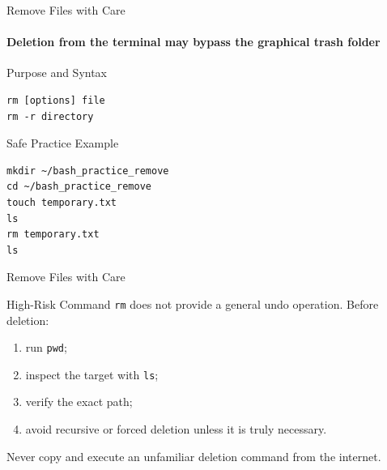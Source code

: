 \begin{frame}[fragile]{Remove Files with Care}
\framesubtitle{Deletion from the terminal may bypass the graphical trash folder}

\footnotesize

\begin{block}{Purpose and Syntax}
\begin{verbatim}
rm [options] file
rm -r directory
\end{verbatim}
\end{block}

\begin{exampleblock}{Safe Practice Example}
\begin{verbatim}
mkdir ~/bash_practice_remove
cd ~/bash_practice_remove
touch temporary.txt
ls
rm temporary.txt
ls
\end{verbatim}
\end{exampleblock}
\end{frame}


\begin {frame}[fragile]{Remove Files with Care}

\begin{alertblock}{High-Risk Command}
\texttt{rm} does not provide a general undo operation. Before deletion:
\begin{enumerate}
    \setlength{\itemsep}{0.15em}
    \item run \texttt{pwd};
    \item inspect the target with \texttt{ls};
    \item verify the exact path;
    \item avoid recursive or forced deletion unless it is truly necessary.
\end{enumerate}
Never copy and execute an unfamiliar deletion command from the internet.
\end{alertblock}

\end{frame}


